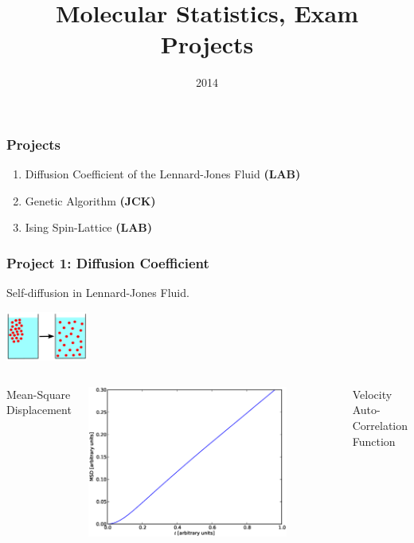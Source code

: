 \documentclass{beamer}
\title[University of Copenhagen]{Molecular Statistics, Exam Projects}
\author{
}
\date{2014}
\begin{document}
\frame[plain]{\titlepage}



\frame
{
    \frametitle{Projects}

    \begin{enumerate}
      \item Diffusion Coefficient of the Lennard-Jones Fluid {\bf (LAB)}
      \item Genetic Algorithm {\bf (JCK)}
      \item Ising Spin-Lattice {\bf (LAB)}
    \end{enumerate}
}

\frame
{
    \frametitle{Project 1: Diffusion Coefficient}
    \centering

    Self-diffusion in Lennard-Jones Fluid.
    \newline

    \includegraphics[width=0.2\textwidth]{images/diffusion_illustration.png}

    \begin{columns}[c]
      \centering

        Mean-Square Displacement

        \includegraphics[width=0.8\textwidth]{images/diffusion_msd.eps}

      \centering

        Velocity Auto-Correlation Function


\end{columns}}
\end{document}

